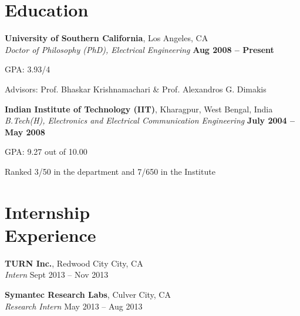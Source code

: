 \documentclass[margin,line]{resume}
\begin{document}
\begin{resume}
    \section{\mysidestyle Education}

    \textbf{University of Southern California}, Los Angeles, CA \\%
    \textsl{Doctor of Philosophy (PhD), Electrical Engineering} \hfill \textbf{ Aug 2008 -- Present}\vspace{-3mm}\\\vspace{-1mm}
    \begin{list2}
        \item GPA: 3.93/4
        \item Advisors:  Prof. Bhaskar Krishnamachari \& Prof. Alexandros G. Dimakis
    \end{list2}\vspace{-1.5mm}
    
    \textbf{Indian Institute of Technology (IIT)}, Kharagpur, West Bengal, India \\%
    \textsl{B.Tech(H), Electronics and Electrical Communication Engineering} \hfill \textbf{ July 2004 -- May 2008}\vspace{-3mm}\\\vspace{-1mm}%
    \begin{list2}
    		\item GPA:	9.27 out of 10.00
    		\item Ranked 3/50 in the department and 7/650 in the Institute        
    \end{list2}\vspace{-1.5mm}%

\section{\mysidestyle Internship\\Experience}

	\textbf{TURN Inc.}, Redwood City City, CA\\
    \textsl{Intern} \hfill Sept 2013 -- Nov 2013
    
    \textbf{Symantec Research Labs}, Culver City, CA\\
    \textsl{Research Intern} \hfill May 2013 -- Aug 2013
	

\end{resume}
\end{document}
